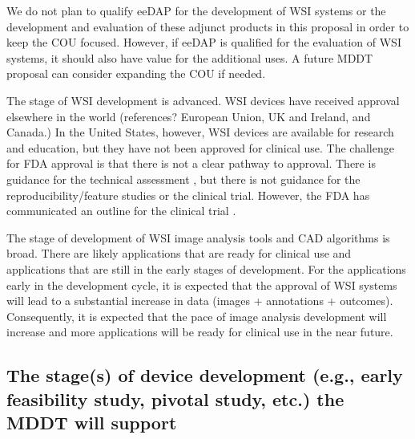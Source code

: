 \documentclass{article}%
\begin{document}
We do not plan to qualify eeDAP for the development of WSI systems or the
development and evaluation of these adjunct products in this proposal in order
to keep the COU focused. However, if eeDAP is qualified for the evaluation of
WSI systems, it should also have value for the additional uses. A future MDDT
proposal can consider expanding the COU if needed.

The stage of WSI development is advanced. WSI devices have received approval
elsewhere in the world (references? European Union, UK and Ireland, and
Canada.) In the United States, however, WSI devices are available for research
and education, but they have not been approved for clinical use. The challenge
for FDA approval is that there is not a clear pathway to approval. There is
guidance for the technical assessment
\cite{FDA2016_Guidance-DigiPathTechnical}, but there is not guidance for the
reproducibility/feature studies or the clinical trial. However, the FDA has
communicated an outline for the clinical trial
\cite{Anderson2016_Path-Visions_presentation}.

The stage of development of WSI image analysis tools and CAD algorithms is
broad. There are likely applications that are ready for clinical use and
applications that are still in the early stages of development. For the
applications early in the development cycle, it is expected that the approval
of WSI systems will lead to a substantial increase in data (images +
annotations + outcomes). Consequently, it is expected that the pace of image
analysis development will increase and more applications will be ready for
clinical use in the near future.

\subsection{The stage(s) of device development (e.g., early feasibility study,
pivotal study, etc.) the MDDT will support}

\label{the-stages-of-device-development-e.g.-early-feasibility-study-pivotal-study-etc.}%
\end{document}
